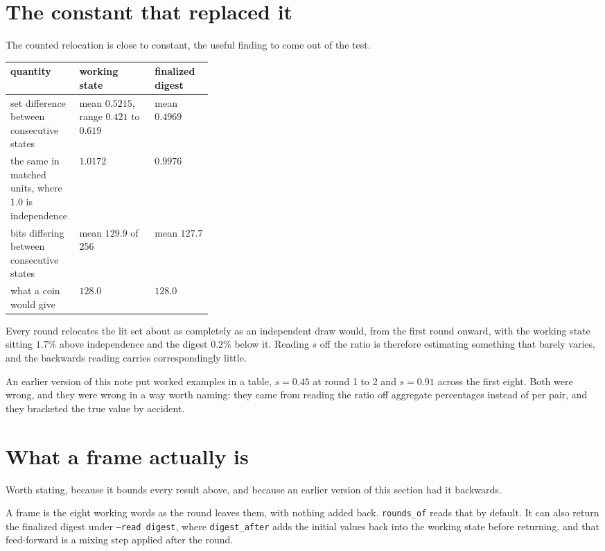 \section{The constant that replaced it}

The counted relocation is close to constant, the useful finding to come out of the test.

\begin{center}
\begin{tabular}{@{}p{0.34\linewidth}ll@{}}
\toprule
quantity & working state & finalized digest \\
\midrule
set difference between consecutive states & mean \(0.5215\), range \(0.421\) to \(0.619\) & mean \(0.4969\) \\
the same in matched units, where \(1.0\) is independence & \(1.0172\) & \(0.9976\) \\
bits differing between consecutive states & mean \(129.9\) of \(256\) & mean \(127.7\) \\
what a coin would give & \(128.0\) & \(128.0\) \\
\bottomrule
\end{tabular}
\end{center}

Every round relocates the lit set about as completely as an independent draw would, from the first round onward, with the working state sitting \(1.7\%\) above independence and the digest \(0.2\%\) below it. Reading \(s\) off the ratio is therefore estimating something that barely varies, and the backwards reading carries correspondingly little.

An earlier version of this note put worked examples in a table, \(s = 0.45\) at round 1 to 2 and \(s = 0.91\) across the first eight. Both were wrong, and they were wrong in a way worth naming: they came from reading the ratio off aggregate percentages instead of per pair, and they bracketed the true value by accident.

\section{What a frame actually is}

Worth stating, because it bounds every result above, and because an earlier version of this section had it backwards.

A frame is the eight working words as the round leaves them, with nothing added back. \texttt{rounds\_of} reads that by default. It can also return the finalized digest under \texttt{--read digest}, where \texttt{digest\_after} adds the initial values back into the working state before returning, and that feed-forward is a mixing step applied after the round.

